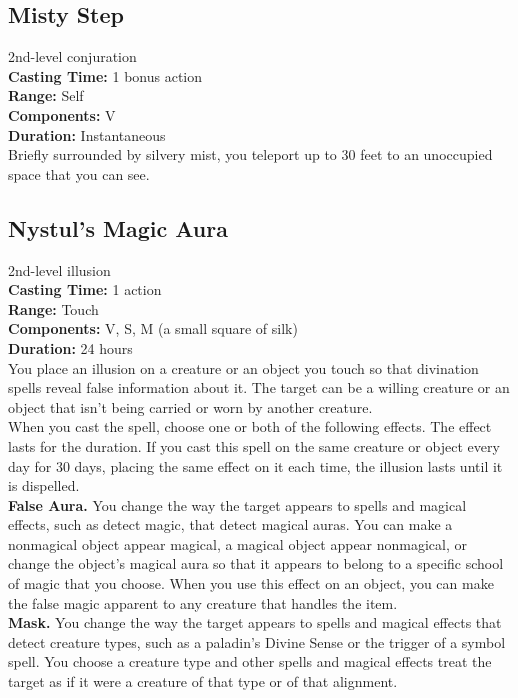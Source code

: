 \documentclass[11pt, A4paper, english]{article}
\begin{document}
		\subsection{Misty Step}
2nd-level conjuration \\
\textbf{Casting Time:} 1 bonus action \\
\textbf{Range:} Self \\
\textbf{Components:} V \\
\textbf{Duration:} Instantaneous \\
Briefly surrounded by silvery mist, you teleport up to 30 feet to an unoccupied space that you can see.

		\subsection{Nystul's Magic Aura}
2nd-level illusion \\
\textbf{Casting Time:} 1 action \\
\textbf{Range:} Touch \\
\textbf{Components:} V, S, M (a small square of silk) \\
\textbf{Duration:} 24 hours \\
You place an illusion on a creature or an object you touch so that divination spells reveal false information about it. The target can be a willing creature or an object that isn’t being carried or worn by another creature. \\
When you cast the spell, choose one or both of the following effects. The effect lasts for the duration. If you cast this spell on the same creature or object every day for 30 days, placing the same effect on it each time, the illusion lasts until it is dispelled. \\
\textbf{False Aura.} You change the way the target appears to spells and magical effects, such as detect magic, that detect magical auras. You can make a nonmagical object appear magical, a magical object appear nonmagical, or change the object’s magical aura so that it appears to belong to a specific school of magic that you choose. When you use this effect on an object, you can make the false magic apparent to any creature that handles the item. \\
\textbf{Mask.} You change the way the target appears to spells and magical effects that detect creature types, such as a paladin's Divine Sense or the trigger of a symbol spell. You choose a creature type and other spells and magical effects treat the target as if it were a creature of that type or of that alignment.
\end{document}
